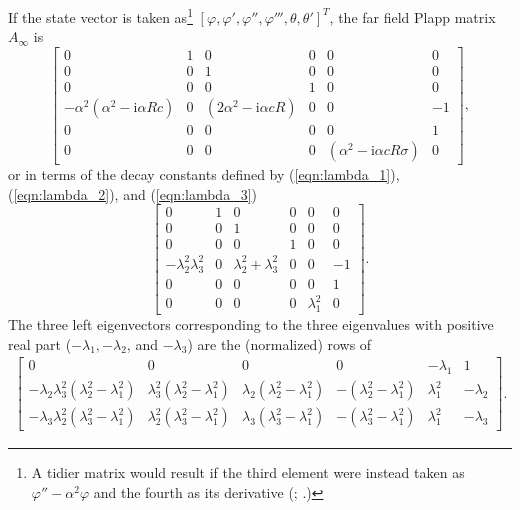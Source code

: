 \documentclass{article}
\begin{document}
If the state vector is taken as\footnote{A tidier matrix would result
if the third element were instead taken as $\varphi''-\alpha^2\varphi$
and the fourth as its derivative (\citealp[p.~57]{Keller76:NST};
\citealp[p.~207]{Drazin81:HS}.)}  $[\varphi, \varphi', \varphi'',
\varphi''', \theta, \theta']^T$, the far field Plapp matrix $A_\infty
$ is
\begin{equation}
 \left[\begin{array}{cccccc}
0 & 1 & 0 & 0 & 0 & 0 \\
0 & 0 & 1 & 0 & 0 & 0  \\
0 & 0 & 0 & 1 & 0 & 0  \\
-\alpha^2(\alpha^2-\mathrm{i}\alpha R c) & 0 & 
  (2\alpha^2-\mathrm{i}\alpha c R) & 0 & 0 & -1  \\
0 & 0 & 0 & 0 & 0 & 1  \\
0 & 0 & 0 & 0 & (\alpha^2-\mathrm{i}\alpha c R\sigma) & 0  
                 \end{array}\right],
\end{equation}
or in terms of the decay constants defined by (\ref{eqn:lambda_1}),
(\ref{eqn:lambda_2}), and (\ref{eqn:lambda_3})
\begin{equation}
\left[\begin{array}{cccccc}
0 & 1 & 0 & 0 & 0 & 0 \\
0 & 0 & 1 & 0 & 0 & 0  \\
0 & 0 & 0 & 1 & 0 & 0  \\
-\lambda_2^2 \lambda_3^2 & 0 & 
  \lambda_2^2+\lambda_3^2 & 0 & 0 & -1  \\
0 & 0 & 0 & 0 & 0 & 1  \\
0 & 0 & 0 & 0 & \lambda_1^2 & 0  
                 \end{array}\right].
\end{equation}
The three left eigenvectors corresponding to the three eigenvalues
with positive real part ($-\lambda_1, -\lambda_2$, and $-\lambda_3$)
are the (normalized) rows of
\begin{eqnarray}
\left[\begin{array}{cccccc} 0 & 0 & 0 & 0 & -\lambda_1 &
1\\
-\lambda_2\lambda_3^2(\lambda_2^2-\lambda_1^2) &
\lambda_3^2(\lambda_2^2-\lambda_1^2) &
\lambda_2(\lambda_2^2-\lambda_1^2) & -(\lambda_2^2-\lambda_1^2) &
\lambda_1^2 & -\lambda_2\\
-\lambda_3\lambda_2^2(\lambda_3^2-\lambda_1^2) &
\lambda_2^2(\lambda_3^2-\lambda_1^2) &
\lambda_3(\lambda_3^2-\lambda_1^2) & -(\lambda_3^2-\lambda_1^2) &
\lambda_1^2 & -\lambda_3 \end{array}\right].
\label{eqn:xi_123}
\end{eqnarray}
\end{document}
